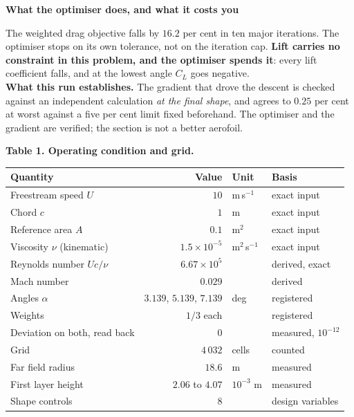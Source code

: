 \documentclass[9pt,a4paper]{article}
\renewcommand{\footnotesize}{\fontsize{6.4}{6.85}\selectfont}
\begin{document}
\vspace{2.5pt}
\begin{minipage}[t]{0.505\textwidth}
\textbf{What the optimiser does, and what it costs you}

\vspace{1pt}
{\footnotesize The weighted drag objective falls by $16.2$ per cent in ten
major iterations. The optimiser stops on its own tolerance, not on the
iteration cap. \textbf{Lift carries no constraint in this problem, and the
optimiser spends it}: every lift coefficient falls, and at the lowest angle
$C_L$ goes negative.\\[2pt]
\textbf{What this run establishes.} The gradient that drove the descent is
checked against an independent calculation \emph{at the final shape}, and agrees
to $0.25$ per cent at worst against a five per cent limit fixed beforehand. The
optimiser and the gradient are verified; the section is not a better aerofoil.}

\vspace{2.5pt}
\textbf{Table 1. Operating condition and grid.}

\vspace{1.5pt}
{\fontsize{6.7}{7.9}\selectfont
\begin{tabular}{@{}l r l l@{}}
\toprule
Quantity & Value & Unit & Basis \\
\midrule
Freestream speed $U$          & $10$                & m\,s$^{-1}$     & exact input \\
Chord $c$                     & $1$                 & m               & exact input \\
Reference area $A$            & $0.1$               & m$^2$           & exact input \\
Viscosity $\nu$ (kinematic)   & $1.5\times10^{-5}$  & m$^2$\,s$^{-1}$ & exact input \\
Reynolds number $Uc/\nu$      & $6.67\times10^{5}$  &                 & derived, exact \\
Mach number                   & $0.029$             &                 & derived \\
Angles $\alpha$               & $3.139$, $5.139$, $7.139$ & deg       & registered \\
Weights                       & $1/3$ each          &                 & registered \\
Deviation on both, read back  & $0$                 &                 & measured, $10^{-12}$ \\
\midrule
Grid                          & $4\,032$            & cells           & counted \\
Far field radius              & $18.6$              & m               & measured \\
First layer height            & $2.06$ to $4.07$    & $10^{-3}$ m     & measured \\
Shape controls                & $8$                 &                 & design variables \\
\bottomrule
\end{tabular}}


\end{minipage}
\end{document}
